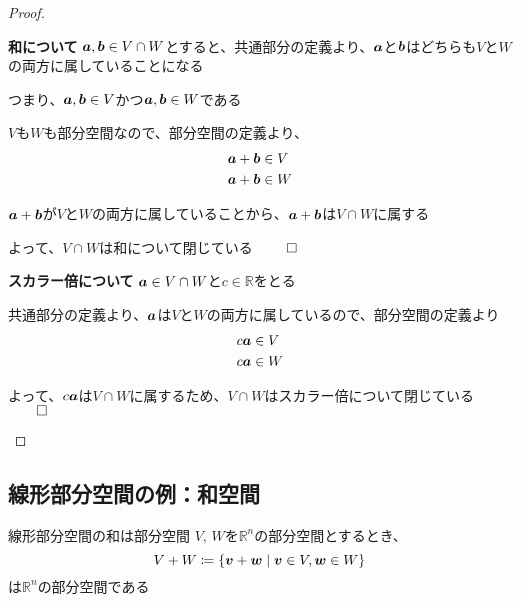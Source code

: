 \documentclass[../../../topic_linear-algebra]{subfiles}
\begin{document}
\begin{proof}
  \begin{subpattern}{\bfseries 和について}
    $\vb*{a}, \vb*{b} \in V \cap W$とすると、共通部分の定義より、$\vb*{a}$と$\vb*{b}$はどちらも$V$と$W$の両方に属していることになる

    つまり、$\vb*{a}, \vb*{b} \in V$かつ$\vb*{a}, \vb*{b} \in W$である

    \br

    $V$も$W$も部分空間なので、部分空間の定義より、
    \begin{align*}
      \vb*{a} + \vb*{b} & \in V \\
      \vb*{a} + \vb*{b} & \in W
    \end{align*}

    $\vb*{a} + \vb*{b}$が$V$と$W$の両方に属していることから、$\vb*{a} + \vb*{b}$は$V \cap W$に属する

    よって、$V \cap W$は和について閉じている $\qed$
  \end{subpattern}

  \begin{subpattern}{\bfseries スカラー倍について}
    $\vb*{a} \in V \cap W$と$c \in \mathbb{R}$をとる

    共通部分の定義より、$\vb*{a}$は$V$と$W$の両方に属しているので、部分空間の定義より
    \begin{align*}
      c \vb*{a} & \in V \\
      c \vb*{a} & \in W
    \end{align*}

    よって、$c \vb*{a}$は$V \cap W$に属するため、$V \cap W$はスカラー倍について閉じている $\qed$
  \end{subpattern}
\end{proof}

\subsection{線形部分空間の例：和空間}

\begin{theorem}{線形部分空間の和は部分空間}
  $V,\,W$を$\mathbb{R}^n$の部分空間とするとき、
  \begin{equation*}
    V + W \coloneq \{ \vb*{v} + \vb*{w} \mid \vb*{v} \in V, \vb*{w} \in W \}
  \end{equation*}
  は$\mathbb{R}^n$の部分空間である
\end{theorem}
\end{document}

